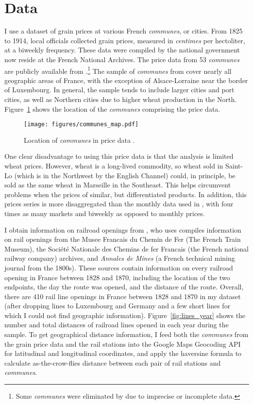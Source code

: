 \documentclass[12pt,twoside]{article}
\begin{document}
\section{Data}

I use a dataset of grain prices at various French \emph{communes}, or cities.
From 1825 to 1914, local officials collected grain prices, measured in \emph{centimes} per hectoliter, at a biweekly frequency.
These data were compiled by the national government now reside at the French National Archives.
The price data from 53 \emph{communes} are publicly available from \cite{prices}.\footnote{Some \emph{communes} were eliminated by \cite{prices} due to imprecise or incomplete data.}
The sample of \emph{communes} from \cite{prices} cover nearly all geographic areas of France, with the exception of Alsace-Lorraine near the border of Luxembourg.
In general, the sample tends to include larger cities and port cities, as well as Northern cities due to higher wheat production in the North.
Figure~\ref{fig:communes_map} shows the location of the \emph{communes} comprising the price data.

\begin{figure}[ht]
	\centering
	\caption{Location of \emph{communes} in price data \citep{prices}.}
	\texttt{[image: figures/communes\_map.pdf]}
	\label{fig:communes_map}
\end{figure}

One clear disadvantage to using this price data is that the analysis is limited wheat prices.
However, wheat is a long-lived commodity, so wheat sold in Saint-Lo (which is in the Northwest by the English Channel) could, in principle, be sold as the same wheat in Marseille in the Southeast.
This helps circumvent problems when the prices of similar, but differentiated products.
In addition, this prices series is more disaggregated than the monthly data used in \cite{persson}, with four times as many markets and biweekly as opposed to monthly prices.

I obtain information on railroad openings from \cite{palau1,palau2,palau3,palau4}, who uses compiles information on rail openings from the Musee Francais du Chemin de Fer (The French Train Museum), the Soci\'{e}t\'{e} Nationale des Chemins de fer Francais (the French national railway company) archives, and \emph{Annales de Mines} (a French technical mining journal from the 1800s).
These sources contain information on every railroad opening in France between 1828 and 1870, including the location of the two endpoints, the day the route was opened, and the distance of the route.
Overall, there are 410 rail line openings in France between 1828 and 1870 in my dataset (after dropping lines to Luxembourg and Germany and a few short lines for which I could not find geographic information).
Figure~\ref{fig:lines_year} shows the number and total distances of railroad lines opened in each year during the sample.
To get geographical distance information, I feed both the \emph{communes} from the grain price data and the rail stations into the Google Maps Geocoding API \citep{google} for latitudinal and longitudinal coordinates, and apply the haversine formula to calculate as-the-crow-flies distance between each pair of rail stations and \emph{communes}.
\end{document}
